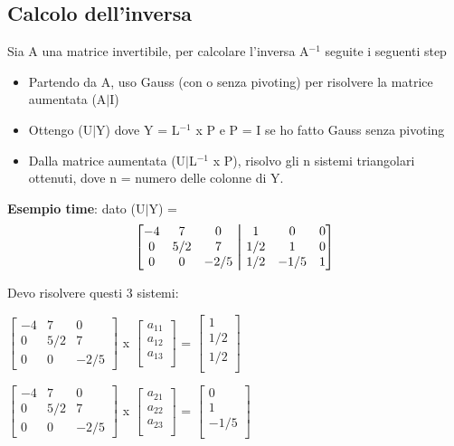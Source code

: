\subsection{Calcolo dell'inversa}
\label{Calcolo dell'inversa}
Sia A una matrice invertibile, per calcolare l'inversa A$^{-1}$ seguite i seguenti step
\begin{itemize}
\item Partendo da A, uso Gauss (con o senza pivoting) per risolvere la matrice aumentata (A$\mid$I)
\item Ottengo (U$\mid$Y) dove Y = L$^{-1}$ x P e P = I se ho fatto Gauss senza pivoting
\item Dalla matrice aumentata (U$\mid$L$^{-1}$ x P), risolvo gli n sistemi triangolari ottenuti, dove n = numero delle colonne di Y.
\end{itemize}
\noindent

\textbf{Esempio time}: dato (U$\mid$Y) =
$$
\begin{bmatrix}
  -4 & 7 & 0 & \aug & 1 & 0 & 0 \\
  0 & 5/2 & 7 & \aug &1/2 & 1 & 0 \\
  0 & 0 & -2/5 & \aug & 1/2 & -1/5 & 1 
\end{bmatrix}
$$

Devo risolvere questi 3 sistemi:
\begin{center}
$
\begin{bmatrix}
-4 & 7 & 0 \\
0 & 5/2 & 7 \\
0 & 0 & -2/5 
\end{bmatrix}
$
x
$
\begin{bmatrix}
a_{11} \\
a_{12} \\
a_{13} \\
\end{bmatrix}
$
=
$
\begin{bmatrix}
1 \\
1/2 \\
1/2 \\
\end{bmatrix}
$
\end{center}


\begin{center}
$
\begin{bmatrix}
-4 & 7 & 0 \\
0 & 5/2 & 7 \\
0 & 0 & -2/5 
\end{bmatrix}
$
x
$
\begin{bmatrix}
a_{21} \\
a_{22} \\
a_{23} \\
\end{bmatrix}
$
=
$
\begin{bmatrix}
0 \\
1 \\
-1/5 \\
\end{bmatrix}
$
\end{center}


